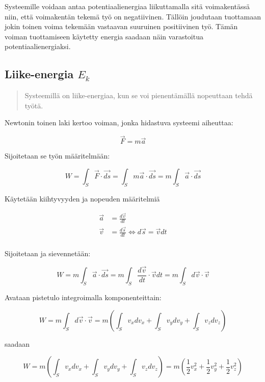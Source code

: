 \documentclass[12pt,a4paper,finnish]{book}
\begin{document}
Systeemille voidaan antaa potentiaalienergiaa liikuttamalla sitä voimakentässä niin, että voimakentän 
tekemä työ on negatiivinen. Tällöin joudutaan tuottamaan jokin toinen voima tekemään vastaavan 
suuruinen positiivinen työ. Tämän voiman tuottamiseen käytetty energia saadaan näin varastoitua 
potentiaalienergiaksi.

\subsection{Liike-energia $E_k$}

\begin{quotation}
 Systeemillä on liike-energiaa, kun se voi pienentämällä nopeuttaan tehdä työtä.
\end{quotation}

Newtonin toinen laki kertoo voiman, jonka hidastuva systeemi aiheuttaa:

\begin{equation}
 \vec{F} = m\vec{a}
\end{equation}

Sijoitetaan se työn määritelmään:

\begin{equation}
 W = \int_S \vec{F} \cdot \vec{ds} = \int_S m\vec{a} \cdot \vec{ds} = m\int_S \vec{a} \cdot \vec{ds}
\end{equation}

Käytetään kiihtyvyyden ja nopeuden määritelmiä 

\begin{align}
\vec{a} &= \frac{d\vec{v}}{dt} \\
\vec{v} &= \frac{d\vec{s}}{dt} \Leftrightarrow d\vec{s} =  \vec{v}dt\\
\end{align}

Sijoitetaan ja sievennetään:

\begin{equation}
 W = m\int_S \vec{a} \cdot \vec{ds} = m\int_S \frac{d\vec{v}}{dt} \cdot \vec{v}dt = m\int_S d\vec{v} \cdot \vec{v}
\end{equation}

Avataan pistetulo integroimalla komponenteittain:

\begin{equation}
 W = m\int_S d\vec{v} \cdot \vec{v} = m \left(\int_S v_xdv_x + \int_S v_ydv_y + \int_S v_zdv_z\right)
\end{equation}

saadaan

\begin{equation}
 W = m \left(\int_S v_xdv_x + \int_S v_ydv_y + \int_S v_zdv_z\right) 
 = m \left(\frac{1}{2}v_x^2 + \frac{1}{2}v_y^2 + \frac{1}{2}v_z^2\right)
\end{equation}
\end{document}
